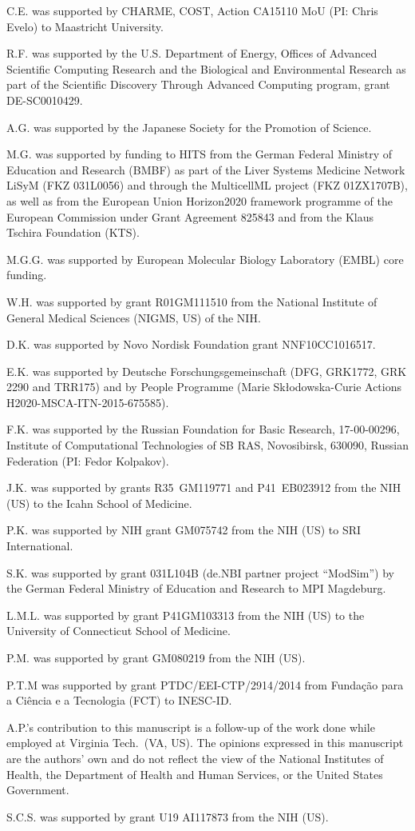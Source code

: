 \documentclass{sbml-paper}
\begin{document}
C.E. was supported by CHARME, COST, Action CA15110 MoU (PI: Chris Evelo) to Maastricht University.

R.F. was supported by the U.S. Department of Energy, Offices of Advanced Scientific Computing Research and the Biological and Environmental Research as part of the Scientific Discovery Through Advanced Computing program, grant \No DE-SC0010429.

A.G. was supported by the Japanese Society for the Promotion of Science.

M.G. was supported by funding to HITS from the German Federal Ministry of Education and Research (BMBF) as part of the Liver Systems Medicine Network LiSyM (FKZ 031L0056) and through the MulticellML project (FKZ 01ZX1707B), as well as from the European Union Horizon2020 framework programme of the European Commission under Grant Agreement 825843 and from the Klaus Tschira Foundation (KTS).

M.G.G. was supported by European Molecular Biology Laboratory (EMBL) core funding.

W.H. was supported by grant \No R01GM111510 from the National Institute of General Medical Sciences (NIGMS, US) of the NIH.

D.K. was supported by Novo Nordisk Foundation grant \No NNF10CC1016517.

E.K. was supported by Deutsche Forschungsgemeinschaft (DFG, GRK1772, GRK 2290 and TRR175) and by People Programme (Marie Skłodowska-Curie Actions H2020-MSCA-ITN-2015-675585).

F.K. was supported by the Russian Foundation for Basic Research, 17-00-00296, Institute of Computational Technologies of SB RAS, Novosibirsk, 630090, Russian Federation (PI: Fedor Kolpakov).

J.K. was supported by grants \No R35~GM119771 and P41~EB023912 from the NIH (US) to the Icahn School of Medicine.

P.K. was supported by NIH grant \No GM075742 from the NIH (US) to SRI International.

S.K. was supported by grant \No 031L104B (de.NBI partner project ``ModSim'') by the German Federal Ministry of Education and Research to MPI Magdeburg.

L.M.L. was supported by grant \No P41GM103313 from the NIH (US) to the University of Connecticut School of Medicine.

P.M. was supported by grant \No GM080219 from the NIH (US).

P.T.M was supported by grant \No PTDC/EEI-CTP/2914/2014 from Fundação para a Ciência e a Tecnologia (FCT) to INESC-ID.

A.P.'s contribution to this manuscript is a follow-up of the work done while employed at Virginia Tech.\ (VA, US). The opinions expressed in this manuscript are the authors' own and do not reflect the view of the National Institutes of Health, the Department of Health and Human Services, or the United States Government.

S.C.S. was supported by grant \No U19 AI117873 from the NIH (US).
\end{document}
